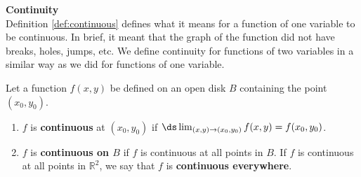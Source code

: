 \noindent\textbf{\large Continuity}\\

Definition \ref{def:continuous} defines what it means for a function of one variable to be continuous. In brief, it meant that the graph of the function did not have breaks, holes, jumps, etc. We define continuity for functions of two variables in a similar way as we did for functions of one variable.

{Let a function $f(x,y)$ be defined on an open disk $B$ containing the point $(x_0,y_0)$. 

\begin{enumerate}
	\item $f$ is \textbf{continuous} at $(x_0,y_0)$ if $\ds\lim_{(x,y)\to(x_0,y_0)} f(x,y) = f(x_0,y_0)$.
	\item	$f$ is \textbf{continuous on $B$} if $f$ is continuous at all points in $B$. If $f$ is continuous at all points in $\mathbb{R}^2$, we say that $f$ is \textbf{continuous everywhere}.
\end{enumerate}
}

